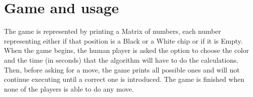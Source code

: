 \documentclass[]{report}
\begin{document}
\section*{Game and usage}
The game is represented by printing a Matrix of numbers, each number representing either if that position is a Black or a White chip or if it is Empty. When the game begins, the human player is asked the option to choose the color and the time (in seconds) that the algorithm will have to do the calculations. Then, before asking for a move, the game prints all possible ones and will not continue executing until a correct one is introduced. The game is finished when none of the players is able to do any move.
\end{document}
